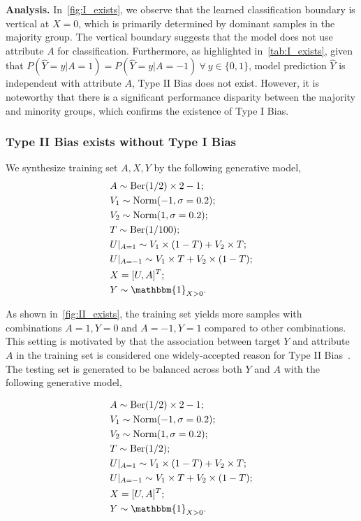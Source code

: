 \noindent
\textbf{Analysis.}
In~\cref{fig:I_exists}, we observe that the learned classification boundary is vertical at $X=0$, which is primarily determined by dominant samples in the majority group.
The vertical boundary suggests that the model does not use attribute $A$ for classification.
Furthermore, as highlighted in~\cref{tab:I_exists}, given that $P(\hat{Y}=y|A=1) = P(\hat{Y}=y|A=-1)~\forall~y \in \{0,1\}$, model prediction $\hat{Y}$ is independent with attribute $A$, \ie Type II Bias does not exist.
However, it is noteworthy that there is a significant performance disparity between the majority and minority groups, which confirms the existence of Type I Bias.













\subsubsection{Type II Bias exists without Type I Bias}
We synthesize training set \wrt $A,X,Y$ by the following generative model,
\begin{align*}
&A \sim \text{Ber}(1/2) \times 2 - 1; \\
&V_1 \sim \text{Norm}(-1,\sigma=0.2); \\
&V_2 \sim \text{Norm}(1,\sigma=0.2); \\
&T \sim \text{Ber}(1/100); \\
&U|_{A=1} \sim V_1 \times (1-T) + V_2 \times T; \\
&U|_{A=-1} \sim V_1 \times T + V_2 \times (1-T); \\
&X = [U,A]^T; \\
&Y \sim \mathbbm{1}_{X > 0}.
\end{align*}

\noindent
As shown in~\cref{fig:II_exists}, the training set yields more samples with combinations $A=1,Y=0$ and $A=-1,Y=1$ compared to other combinations.
This setting is motivated by that the association between target $Y$ and attribute $A$ in the training set is considered one widely-accepted reason for Type II Bias~\cite{LfF_CelebA_Bias_conflicting,CSAD,End}.
The testing set is generated to be balanced across both $Y$ and $A$ with the following generative model,

\begin{align*}
&A \sim \text{Ber}(1/2) \times 2 - 1; \\
&V_1 \sim \text{Norm}(-1,\sigma=0.2); \\
&V_2 \sim \text{Norm}(1,\sigma=0.2); \\
&T \sim \text{Ber}(1/2); \\
&U|_{A=1} \sim V_1 \times (1-T) + V_2 \times T; \\
&U|_{A=-1} \sim V_1 \times T + V_2 \times (1-T); \\
&X = [U,A]^T; \\
&Y \sim \mathbbm{1}_{X > 0}.
\end{align*}




